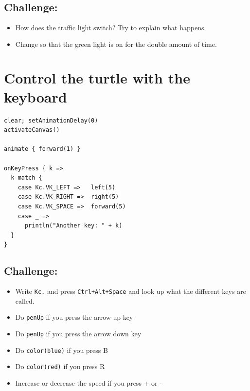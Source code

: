 \section*{\color{BrickRed}Challenge:}


\begin{itemize}

\item {How does the traffic light switch? Try to explain what happens.}
\item {Change so that the green light is on for the double amount of time.}

\end{itemize}


\chapter{Control the turtle with the keyboard}
\begin{multicols}{2}

\begin{lstlisting}[basicstyle={\ttfamily\fontsize{18}{22}\selectfont},numbers=none]
clear; setAnimationDelay(0)
activateCanvas()

animate { forward(1) }

onKeyPress { k =>
  k match {
    case Kc.VK_LEFT =>   left(5)
    case Kc.VK_RIGHT =>  right(5)
    case Kc.VK_SPACE =>  forward(5)
    case _ => 
      println("Another key: " + k)
  }
}
\end{lstlisting}
        


\columnbreak


\section*{\color{BrickRed}Challenge:}


\begin{itemize}

\item {Write \lstinline{Kc.} and press \lstinline{Ctrl+Alt+Space} and look up what the different keys are called.}
\item {Do \lstinline{penUp} if you press the arrow up key}
\item {Do \lstinline{penUp} if you press the arrow down key}
\item {Do \lstinline{color(blue)} if you press B}
\item {Do \lstinline{color(red)} if you press R}
\item {Increase or decrease the speed if you press + or -}

\end{itemize}


\end{multicols}

